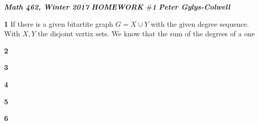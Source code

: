 \documentclass[12pt]{article}
\newenvironment{ques}{\vspace{2 ex}}{\vspace{2 ex}}
\theoremstyle{definition}
\begin{document}
\noindent \textit{\textbf{Math 462, Winter 2017}} \hspace{1.3cm}
\textit{\textbf{HOMEWORK $\#$1}} \hspace{1.3cm} \textit{\textbf{Peter
Gylys-Colwell}} 

\vspace{1cm}
\begin{ques}
	\textbf{1}
		If there is a given bitartite graph $G = X \cup Y$ with the
		given degree sequence. With $X, Y$ the disjoint vertix sets. We know
		that the sum of the degrees of a one 
\end{ques}

\begin{ques}
	\textbf{2}
\end{ques}

\begin{ques}
	\textbf{3}
\end{ques}

\begin{ques}
	\textbf{4}
\end{ques}

\begin{ques}
	\textbf{5}
\end{ques}

\begin{ques}
	\textbf{6}
\end{ques}
\end{document}
